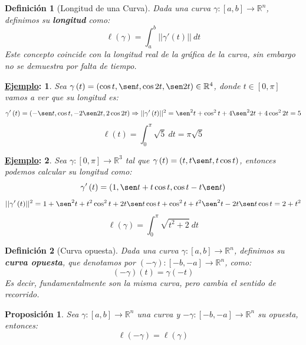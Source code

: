 \documentclass[10pt,a4paper,openright]{book}
\theoremstyle{break}
\newtheorem*{defi}{Definición}
\newtheorem*{prop}{Proposición}
\newtheorem*{ej}{\underline{Ejemplo}:}
\newcommand{\dif}[1]{\ d#1}
\begin{document}
\begin{defi}[Longitud de una Curva]
Dada una curva $\gamma:[a,b]\rightarrow \mathbb{R}^n$, definimos su \textbf{longitud} como:
$$\ell\left( \gamma \right) = \int_{a}^{b} \lvert \lvert \gamma'\left( t \right) \rvert \rvert \dif{t}$$
Este concepto coincide con la longitud real de la gráfica de la curva, sin embargo no se demuestra por falta de tiempo.
\end{defi}

\begin{ej}
Sea $\gamma\left( t \right) = \left( \cos t, \sen t, \cos 2t, \sen 2t \right) \in \mathbb{R}^4$, donde $t \in \left[ 0, \pi \right]$ vamos a ver que su longitud es:
$$\gamma'\left( t \right) = \left( -\sen t, \cos t, -2\sen 2t, 2\cos 2t\right) \Rightarrow \lvert \lvert \gamma'\left( t \right) \rvert \rvert^2 = \sen^2 t + \cos^2 t + 4\sen^2 2t + 4 \cos^2 2t = 5$$
$$\ell \left( t \right) = \int_{0}^{\pi} \sqrt{5} \dif{t} = \pi\sqrt{5} $$
\end{ej}
\begin{ej}
Sea $\gamma: \left[ 0, \pi \right] \rightarrow \mathbb{R}^3$ tal que $\gamma \left( t \right) = \left( t, t\sen t, t \cos t \right) $, entonces podemos calcular su longitud como:
$$\gamma'\left( t \right) = \left( 1, \sen t + t\cos t, \cos t - t \sen t\right) $$
$$\lvert \lvert \gamma'\left( t \right) \rvert \rvert^2 = 1 + \sen^2 t + t^2 \cos^2 t + 2t \sen t \cos t + \cos^2 t + t^2 \sen^2 t - 2t \sen t \cos t = 2 + t^2$$
$$\ell \left( \gamma \right) = \int_{0}^{\pi} \sqrt{t^2 + 2} \dif{t}$$
\end{ej}

\begin{defi}[Curva opuesta]
Dada una curva $\gamma:[a,b]\rightarrow \mathbb{R}^n$, definimos su \textbf{curva opuesta}, que denotamos por $(-\gamma):[-b,-a]\rightarrow \mathbb{R}^n$, como: 
$$\left( -\gamma \right) \left( t \right) = \gamma \left( -t \right) $$
Es decir, fundamentalmente son la misma curva, pero cambia el sentido de recorrido.
\end{defi}

\begin{prop}
Sea $\gamma:[a,b]\rightarrow \mathbb{R}^n$ una curva y $-\gamma:[-b,-a]\rightarrow \mathbb{R}^n$ su opuesta, entonces: 
$$\ell \left( -\gamma \right) = \ell \left( \gamma \right) $$
\end{prop}
\end{document}
